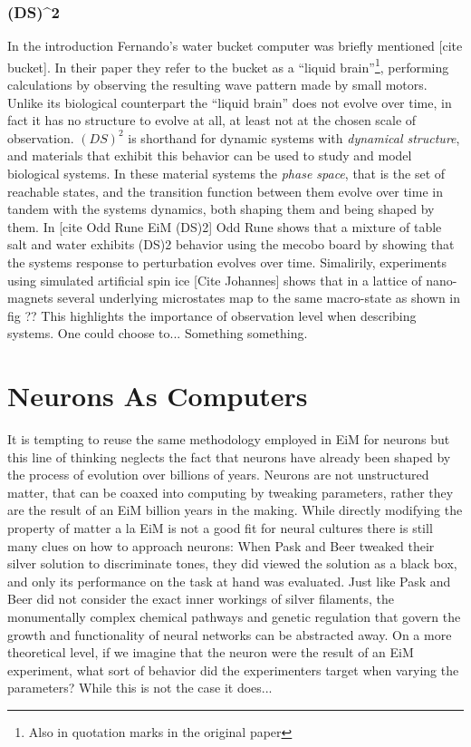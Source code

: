 \subsubsection{(DS)^2}
%
In the introduction Fernando's water bucket computer was briefly mentioned [cite
bucket].
In their paper they refer to the bucket as a ``liquid brain''\footnote{Also in
  quotation marks in the original paper}, performing calculations by observing
the resulting wave pattern made by small motors.
Unlike its biological counterpart the ``liquid brain'' does not evolve over
time, in fact it has no structure to evolve at all, at least not at the chosen
scale of observation.
%
$(DS)^2$ is shorthand for dynamic systems with \emph{dynamical structure}, and
materials that exhibit this behavior can be used to study and model biological
systems.
In these material systems the \emph{phase space}, that is the set of reachable
states, and the transition function between them evolve over time in tandem with
the systems dynamics, both shaping them and being shaped by them.
%
In [cite Odd Rune EiM (DS)2] Odd Rune shows that a mixture of table salt and
water exhibits (DS)2 behavior using the mecobo board by showing that the systems
response to perturbation evolves over time.
%
Simalirily, experiments using simulated artificial spin ice [Cite Johannes]
shows that in a lattice of nano-magnets several underlying microstates map to the
same macro-state as shown in fig ??
This highlights the importance of observation level when describing systems.
One could choose to... Something something.

\section{Neurons As Computers}
It is tempting to reuse the same methodology employed in EiM for neurons but
this line of thinking neglects the fact that neurons have already been shaped by
the process of evolution over billions of years.
Neurons are not unstructured matter, that can be coaxed into computing by
tweaking parameters, rather they are the result of an EiM billion years in the
making.
While directly modifying the property of matter a la EiM is not a good fit for
neural cultures there is still many clues on how to approach neurons:
When Pask and Beer tweaked their silver solution to discriminate tones, they did
viewed the solution as a black box, and only its performance on the task at hand
was evaluated.
Just like Pask and Beer did not consider the exact inner workings of silver
filaments, the monumentally complex chemical pathways and genetic regulation
that govern the growth and functionality of neural networks can be abstracted
away.
On a more theoretical level, if we imagine that the neuron were the result of an
EiM experiment, what sort of behavior did the experimenters target when varying
the parameters?
While this is not the case it does...

